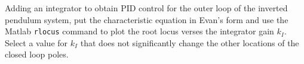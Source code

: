 
Adding an integrator to obtain PID control for the outer loop of the inverted pendulum system, put the characteristic equation in Evan's form and use the Matlab {\tt rlocus} command to plot the root locus verses the integrator gain $k_I$.  Select a value for $k_I$ that does not significantly change the other locations of the closed loop poles.  